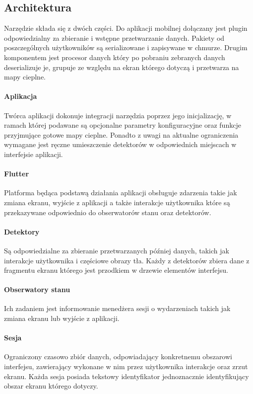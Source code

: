 \subsection{Architektura}
Narzędzie składa się z dwóch części. Do aplikacji mobilnej dołączany jest plugin odpowiedzialny za zbieranie i wstępne przetwarzanie danych. Pakiety od poszczególnych użytkowników są serializowane i zapisywane w chmurze. Drugim komponentem jest procesor danych który po pobraniu zebranych danych deserializuje je, grupuje ze względu na ekran którego dotyczą i przetwarza na mapy cieplne.


\paragraph{Aplikacja}
Twórca aplikacji dokonuje integracji narzędzia poprzez jego inicjalizację, w ramach której podawane są  opcjonalne parametry konfiguracyjne oraz funkcje przyjmujące gotowe mapy cieplne. Ponadto z uwagi na aktualne ograniczenia wymagane jest ręczne umieszczenie detektorów w odpowiednich miejscach w interfejsie aplikacji.

\paragraph{Flutter} Platforma będąca podstawą działania aplikacji obsługuje zdarzenia takie jak zmiana ekranu, wyjście z aplikacji a także interakcje użytkownika które są przekazywane odpowiednio do obserwatorów stanu oraz detektorów.

\paragraph{Detektory} 
\label{par:rs_detectors}
Są odpowiedzialne za zbieranie przetwarzanych później danych, takich jak interakcje użytkownika i częściowe obrazy tła. Każdy z detektorów zbiera dane z fragmentu ekranu którego jest przodkiem w drzewie elementów interfejsu.

\paragraph{Obserwatory stanu} 
\label{par:rs_observers}
Ich zadaniem jest informowanie menedżera sesji o wydarzeniach takich jak zmiana ekranu lub wyjście z aplikacji.

\paragraph{Sesja}
\label{par:rs_session}
Ograniczony czasowo zbiór danych, odpowiadający konkretnemu obszarowi interfejsu, zawierający wykonane w nim przez użytkownika interakcje oraz zrzut ekranu. Każda sesja posiada tekstowy identyfikator jednoznacznie identyfikujący obszar ekranu którego dotyczy.

